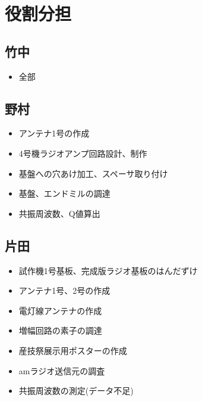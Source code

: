 \documentclass[report.tex]{subfiles}
\begin{document}
\section{役割分担}

\subsection{竹中}

\begin{itemize}
	\item 全部
\end{itemize}

\subsection{野村}

\begin{itemize}
	\item アンテナ1号の作成
	\item 4号機ラジオアンプ回路設計、制作
	\item 基盤への穴あけ加工、スペーサ取り付け
	\item 基盤、エンドミルの調達
	\item 共振周波数、Q値算出
\end{itemize}

\subsection{片田}

\begin{itemize}
	\item 試作機1号基板、完成版ラジオ基板のはんだずけ
	\item アンテナ1号、2号の作成
	\item 電灯線アンテナの作成
	\item 増幅回路の素子の調達
	\item 産技祭展示用ポスターの作成
	\item amラジオ送信元の調査
	\item 共振周波数の測定(データ不足)
\end{itemize}
\end{document}

